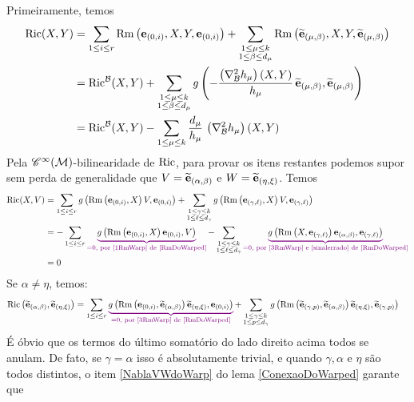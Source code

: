 \begin{demm}
Primeiramente, temos
\begin{align*}
\mathrm{Ric}(X, Y) &= \sum_{1 \leq i \leq r} \mathrm{Rm}\left( \mathbf{e}_{(0, i)}, X, Y, \mathbf{e}_{(0, i)} \right) + \sum_{\substack{1 \leq \mu \leq k \\ 
1 \leq \beta \leq d_{\mu}}} \mathrm{Rm}\left(  \widetilde{\mathbf{e}}_{(\mu, \beta)}, X, Y, \widetilde{\mathbf{e}}_{(\mu, \beta)}  \right) \\
&= \mathrm{Ric}^{\mathcal{B}}(X, Y)  + \sum_{\substack{1 \leq \mu \leq k \\ 
1 \leq \beta \leq d_{\mu}}} g\left(  -\frac{ \left( \nabla^2_{\mathcal{B}} h_{\mu}  \right)(X, Y)}{h_{\mu}} \, \widetilde{\mathbf{e}}_{(\mu, \beta)}, \widetilde{\mathbf{e}}_{(\mu, \beta)}  \right) \\
&= \mathrm{Ric}^{\mathcal{B}}(X, Y)  - \sum_{1 \leq \mu \leq k }  \frac{d_{\mu}}{h_{\mu}} \, \left(  \nabla^{2}_{\mathcal{B}} h_{\mu}  \right)(X, Y)
\end{align*}
Pela $\mathscr{C}^{\infty}(\mathcal{M})$-bilinearidade de $\mathrm{Ric}$, para provar os itens restantes podemos supor sem perda de generalidade que $V = \widetilde{\mathbf{e}}_{(\alpha, \beta)}$ e $W = \widetilde{\mathbf{e}}_{(\eta, \xi)}$. Temos
\begin{align*}
\Ric(X, V) &= \sum_{1 \leq i \leq r} g \parent{ \Rm \parent{ \be_{(0, i)}, X }V, \be_{(0, i)} } + \sum_{ \substack{1 \leq \gamma \leq k \\ 
1 \leq \ell \leq d_{\gamma}}} g \parent{ \Rm \parent{ \be_{(\gamma, \ell)}, X}V, \be_{(\gamma, \ell)}} \\
&= - \sum_{1 \leq i \leq r}  \Munderbrace{g \parent{ \Rm \parent{ \be_{(0, i)}, X }\be_{(0, i)} , V}}{=0, \text{ por \ref{1RmWarp} de \cref{RmDoWarped}}} - \sum_{ \substack{1 \leq \gamma \leq k \\ 
1 \leq \ell \leq d_{\gamma}}}  \Munderbrace{g \parent{  \Rm\parent{ X,  \be_{(\gamma, \ell)} } \be_{(\alpha, \beta)} , \be_{(\gamma, \ell)} }}{=0, \text{ por \ref{3RmWarp} e \ref{sinalerrado} de \cref{RmDoWarped}}} \\
&= 0
\end{align*}
Se $\alpha \neq \eta$, temos:
\begin{align*}
\Ric\parent{\bee_{(\alpha, \beta)}, \bee_{(\eta, \xi)} } &= \sum_{1 \leq i \leq r} \Munderbrace{g\parent{ \Rm\parent{\be_{(0, i)}, \bee_{(\alpha, \beta)}} \bee_{(\eta, \xi)}, \be_{(0, i)}}}{=0, \text{ por \ref{3RmWarp} de \cref{RmDoWarped}}} + \sum_{\substack{1 \leq \gamma \leq k \\
1 \leq p \leq d_{\gamma}} } g \parent{ \Rmm{\bee_{(\gamma, p)}}{\bee_{(\alpha, \beta)}}{\bee_{(\eta, \xi)}}{\bee_{(\gamma, p)}}}
\end{align*}
É óbvio que os termos do último somatório do lado direito acima todos se anulam. De fato, se $\gamma = \alpha$ isso é absolutamente trivial, e quando $\gamma, \alpha$ e $\eta$ são todos distintos, o item \ref{NablaVWdoWarp} do lema \cref{ConexaoDoWarped} garante que

\end{demm}
